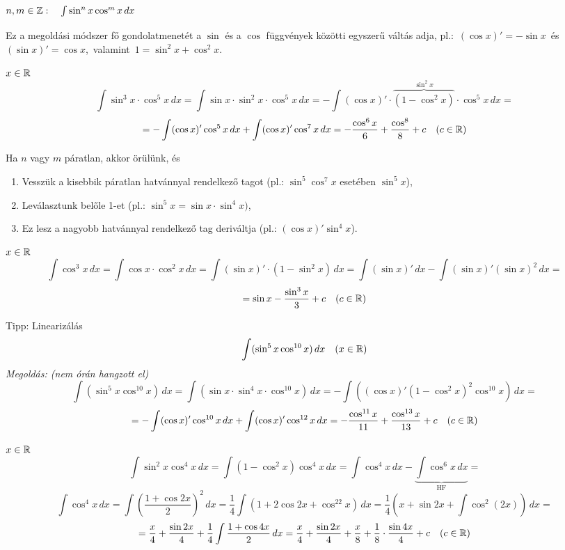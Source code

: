 \documentclass[a4paper,11.5pt]{article}
\begin{document}
	\subsubsection{$n,m\in\mathbb{Z}:\quad \int\sin^n x\cos^mx\,dx$\quad {}\quad}
	\begin{note}
		Ez a megoldási módszer fő gondolatmenetét a $\sin$ és a $\cos$ függvények közötti egyszerű váltás adja, pl.:\, $(\cos x)'=-\sin x$ \,és\, $(\sin x)'=\cos x$, \,valamint \,$1=\sin^2x + \cos^2x$.
	\end{note}
	\begin{task}$x\in\mathbb{R}$
		\[ \int \sin^3x\cdot\cos^5x\,dx=\int\sin x\cdot\sin^2x\cdot\cos^5x\,dx=-\int(\cos x)'\cdot\overbrace{(1-\cos^2 x)}^{\sin^2x}\cdot\cos^5x\,dx=\]
		\[=-\int(\cos x)'\cos^5x\,dx+\int(\cos x)'\cos^7x\,dx=-\frac{\cos^6x}{6}+\frac{\cos^8}{8}+c\quad (c\in\mathbb{R}) \]
	\end{task}
	\begin{note}
		Ha $n$ vagy $m$ páratlan, akkor örülünk, és 
		\begin{enumerate}
			\item Vesszük a kisebbik páratlan hatvánnyal rendelkező tagot (pl.: $\sin^5\cos^7x$ esetében $\sin^5x$),
			\item Leválasztunk belőle 1-et (pl.: $\sin^5x = \sin x\cdot\sin^4 x)$,
			\item Ez lesz a nagyobb hatvánnyal rendelkező tag deriváltja (pl.: $(\cos x)'\sin^4 x$).
		\end{enumerate}
		
	\end{note}
	\begin{task}$x\in\mathbb{R}$
		\[ \int\cos^3x\,dx=\int\cos x\cdot\cos^2x\,dx=\int(\sin x)'\cdot(1-\sin^2x)\,dx=\int(\sin x)'\,dx-\int(\sin x)'(\sin x)^2\,dx=\]
		\[=\sin x-\frac{\sin^3x}{3}+c\quad (c\in\mathbb{R}) \]
	\end{task}
	\begin{exercise} Tipp: Linearizálás 
		\[ \int(\sin^5x\cos^{10}x)\,dx\quad (x\in\mathbb{R}) \]
		\textit{Megoldás: (nem órán hangzott el)}
		\[ \int(\sin^5x\cos^{10}x)\,dx=\int(\sin x\cdot\sin^4x\cdot\cos^{10}x)\,dx=-\int((\cos x)'(1-\cos^2x)^2\cos^{10}x)\,dx=\]
		\[=-\int(\cos x)'\cos^{10}x\,dx+\int(\cos x)'\cos^{12}x\,dx=-\frac{\cos^{11}x}{11}+\frac{\cos^{13}x}{13}+c\quad (c\in\mathbb{R}) \]
	\end{exercise}
	\begin{task}$x\in\mathbb{R}$
		\[ \int\sin^2x\cos^4x\,dx=\int(1-\cos^2x)\cos^4 x\,dx=\int\cos^4 x\,dx-\underbrace{\int\cos^6x\,dx}_{\text{HF}}=\]
		\[\int\cos^4x\,dx=\int\left(\frac{1+\cos2x}{2}\right)^2\,dx=\frac{1}{4}\int(1+2\cos2x+\cos^22x)\,dx=\frac{1}{4}\left(x+\sin2x+\int\cos^2(2x)\right)\,dx=\]
		\[=\frac{x}{4}+\frac{\sin2x}{4}+\frac{1}{4}\int\frac{1+\cos4x}{2}\,dx=\frac{x}{4}+\frac{\sin2x}{4}+\frac{x}{8}+\frac{1}{8}\cdot\frac{\sin4x}{4}+c\quad (c\in\mathbb{R}) \]
		\begin{center}
			\\
		\end{center}
	\end{task}
\end{document}
